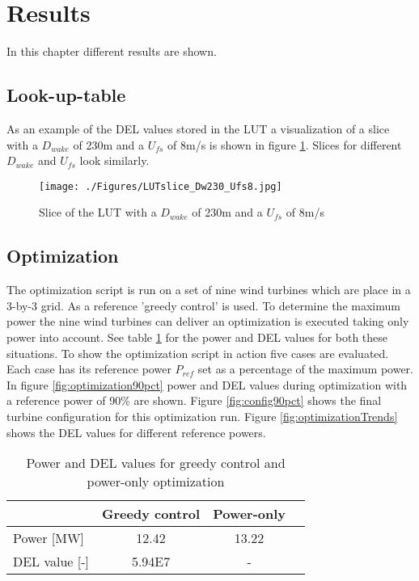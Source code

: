 \section{Results}

In this chapter different results are shown.

\subsection{Look-up-table}
As an example of the DEL values stored in the LUT a visualization of a slice with a $D_{wake}$ of 230m and a $U_{fs}$ of 8m/s is shown in figure \ref{fig:LUTslice}. Slices for different $D_{wake}$ and $U_{fs}$ look similarly.

\begin{figure}
	\texttt{[image: ./Figures/LUTslice\_Dw230\_Ufs8.jpg]}
	\caption{Slice of the LUT with a $D_{wake}$ of 230m and a $U_{fs}$ of 8m/s }
	\label{fig:LUTslice}
\end{figure}

\subsection{Optimization}
The optimization script is run on a set of nine wind turbines which are place in a 3-by-3 grid. As a reference 'greedy control' is used. To determine the maximum power the nine wind turbines can deliver an optimization is executed taking only power into account. See table \ref{tab:reference} for the power and DEL values for both these situations. \newline
To show the optimization script in action five cases are evaluated. Each case has its reference power $P_{ref}$ set as a percentage of the maximum power. In figure \ref{fig:optimization90pct} power and DEL values during optimization with a reference power of 90\% are shown. Figure \ref{fig:config90pct} shows the final turbine configuration for this optimization run. \newline
Figure \ref{fig:optimizationTrends} shows the DEL values for different reference powers.


\begin{table}[h]
	\caption{Power and DEL values for greedy control and power-only optimization}
	\centering
	\label{tab:reference}
	\begin{tabular}{lccc}
		\hline
		& Greedy control & Power-only \\ 
		\hline
		Power [MW] & 12.42 & 13.22 \\
		DEL value [-] & 5.94E7 & - \\
	\end{tabular}
\end{table}


